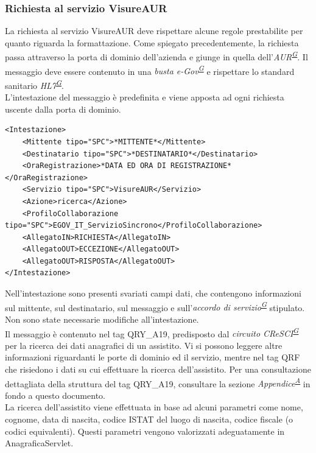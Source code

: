 \documentclass[a4paper]{article}
\begin{document}
\subsubsection{Richiesta al servizio VisureAUR}
La richiesta al servizio VisureAUR deve rispettare alcune regole prestabilite per quanto riguarda la formattazione. Come spiegato precedentemente, la richiesta passa attraverso la porta di dominio dell'azienda e giunge in quella dell'\textit{AUR\textsuperscript{\hyperref[sec:gl]{G}}}. Il messaggio deve essere contenuto in una \textit{busta e-Gov\textsuperscript{\hyperref[sec:gl]{G}}} e rispettare lo standard sanitario \textit{HL7\textsuperscript{\hyperref[sec:gl]{G}}}.
\\
L'intestazione del messaggio è predefinita e viene apposta ad ogni richiesta uscente dalla porta di dominio.
\begin{verbatim}
<Intestazione>
	<Mittente tipo="SPC">*MITTENTE*</Mittente>
	<Destinatario tipo="SPC">*DESTINATARIO*</Destinatario>
	<OraRegistrazione>*DATA ED ORA DI REGISTRAZIONE*</OraRegistrazione>
	<Servizio tipo="SPC">VisureAUR</Servizio>
	<Azione>ricerca</Azione>
	<ProfiloCollaborazione tipo="SPC">EGOV_IT_ServizioSincrono</ProfiloCollaborazione>
	<AllegatoIN>RICHIESTA</AllegatoIN>
	<AllegatoOUT>ECCEZIONE</AllegatoOUT>
	<AllegatoOUT>RISPOSTA</AllegatoOUT>
</Intestazione>
\end{verbatim}
Nell'intestazione sono presenti svariati campi dati, che contengono informazioni sul mittente, sul destinatario, sul messaggio e sull'\textit{accordo di servizio\textsuperscript{\hyperref[sec:gl]{G}}} stipulato. Non sono state necessarie modifiche all'intestazione.
\\
Il messaggio è contenuto nel tag QRY\_A19, predisposto dal \textit{circuito CReSCI\textsuperscript{\hyperref[sec:gl]{G}}} per la ricerca dei dati anagrafici di un assistito. Vi si possono leggere altre informazioni riguardanti le porte di dominio ed il servizio, mentre nel tag QRF che risiedono i dati su cui effettuare la ricerca dell'assistito. Per una consultazione dettagliata della struttura del tag QRY\_A19, consultare la sezione \textit{Appendice\textsuperscript{\hyperref[sec:ap]{A}}} in fondo a questo documento.
\\
La ricerca dell'assistito viene effettuata in base ad alcuni parametri come nome, cognome, data di nascita, codice ISTAT del luogo di nascita, codice fiscale (o codici equivalenti). Questi parametri vengono valorizzati adeguatamente in AnagraficaServlet.
\end{document}
